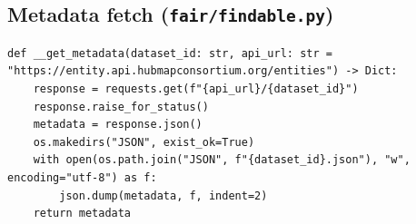 \documentclass[11pt]{article}
\begin{document}
\subsection{Metadata fetch (\texttt{fair/findable.py})}
\begin{lstlisting}[style=python]
def __get_metadata(dataset_id: str, api_url: str = "https://entity.api.hubmapconsortium.org/entities") -> Dict:
    response = requests.get(f"{api_url}/{dataset_id}")
    response.raise_for_status()
    metadata = response.json()
    os.makedirs("JSON", exist_ok=True)
    with open(os.path.join("JSON", f"{dataset_id}.json"), "w", encoding="utf-8") as f:
        json.dump(metadata, f, indent=2)
    return metadata
\end{lstlisting}
\end{document}
